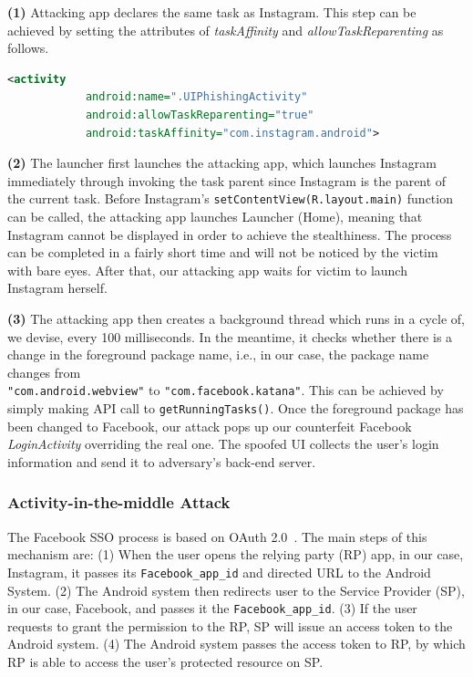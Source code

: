 \documentclass[letterpaper,12pt]{article}
\begin{document}
\textbf{(1)} Attacking app declares the same task as Instagram. This step
can be achieved by setting the attributes of \textit{taskAffinity} and
\textit{allowTaskReparenting} as follows.
\begin{lstlisting}[language=XML]
 <activity
            android:name=".UIPhishingActivity"
            android:allowTaskReparenting="true"
            android:taskAffinity="com.instagram.android">
\end{lstlisting}

\textbf{(2)} The launcher first launches the attacking app, which
launches Instagram immediately through invoking the task parent since
Instagram is the parent of the current task. Before Instagram's
\texttt{setContentView(R.layout.main)} function can be called, the
attacking app launches Launcher (Home), meaning that Instagram cannot
be displayed in order to achieve the stealthiness. The process can be completed in a fairly short time and will not be noticed by the victim with bare eyes. After that, our attacking app waits for victim to launch Instagram herself.


\textbf{(3)} The attacking app then creates a background thread which
runs in a cycle of, we devise, every 100 milliseconds. In the
meantime, it checks whether there is a change in the foreground
package name, i.e., in our case, the package name changes from \\
\texttt{"com.android.webview"} to \texttt{"com.facebook.katana"}. This
can be achieved by simply making API call to
\texttt{getRunningTasks()}. Once the foreground package has been
changed to Facebook, our attack pops up our counterfeit Facebook
\textit{LoginActivity} overriding the real one. The spoofed UI
collects the user's login information and send it to adversary's
back-end server.

\subsubsection{Activity-in-the-middle Attack}
The Facebook SSO process is based on OAuth
2.0~\cite{OAuthDemystified}. The main steps of this mechanism are: (1)
When the user opens the relying party (RP) app, in our case,
Instagram, it passes its \texttt{Facebook\_app\_id} and directed URL
to the Android System.  (2) The Android system then redirects user to
the Service Provider (SP), in our case, Facebook, and passes it the
\texttt{Facebook\_app\_id}.  (3) If the user requests to grant the
permission to the RP, SP will issue an access token to the Android
system.  (4) The Android system passes the access token to RP, by
which RP is able to access the user's protected resource on SP.
\end{document}
